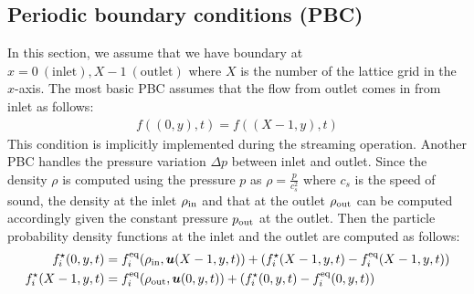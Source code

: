 \subsection{Periodic boundary conditions (PBC)}
In this section, we assume that we have
boundary at $x = 0~(\text{inlet}), X - 1~(\text{outlet})$
where $X$ is the number of the lattice grid in the $x$-axis.
The most basic PBC assumes that
the flow from outlet comes in from inlet as follows\cite{succi2018lattice}: 
\begin{equation}
\begin{aligned}
  f((0, y), t) = f((X - 1, y), t)
\end{aligned}
\end{equation}
This condition is implicitly implemented during the streaming operation.
Another PBC handles
the pressure variation $\Delta p$ between inlet and outlet.
Since the density $\rho$ is computed using the pressure $p$
as $\rho = \frac{p}{c_s^2}$ where $c_s$ is the speed of sound,
the density at the inlet $\rho_{\rm in}$ and
that at the outlet $\rho_{\rm out}$ can be computed
accordingly given the constant pressure $p_{\rm out}$
at the outlet.
Then the particle probability density functions at 
the inlet and the outlet are computed as follows\cite{succi2018lattice}:
\begin{equation}
\begin{aligned}
  f_i^\star(0, y, t) &=
  f_i^{\rm eq}(\rho_{\rm in}, \boldsymbol{u}(X - 1, y, t))
  + (f_i^\star(X - 1, y, t) - f_i^{\rm eq}(X - 1, y, t))\\
  f_i^\star(X - 1, y, t) &=
  f_i^{\rm eq}(\rho_{\rm out}, \boldsymbol{u}(0, y, t))
  + (f_i^\star(0, y, t) - f_i^{\rm eq}(0, y, t))\\
\end{aligned}
\label{discretized-pbc-pressure}
\end{equation}
